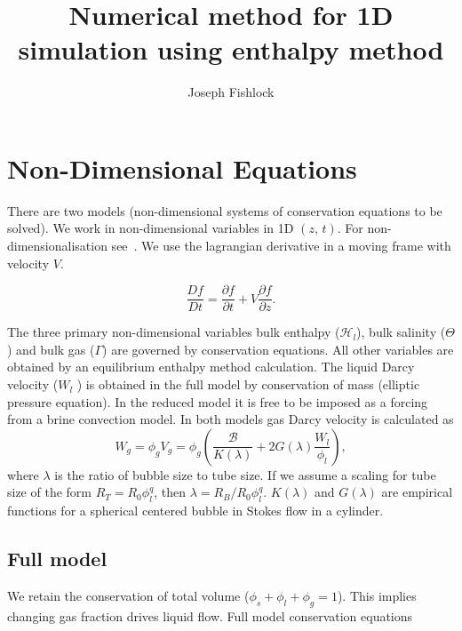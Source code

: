 \documentclass[a4paper,11pt]{article}
\title{\textbf{Numerical method for 1D simulation using enthalpy method}}
\author{Joseph Fishlock}
\numberwithin{equation}{section}
\begin{document}
\maketitle

\tableofcontents

\clearpage

\section{Non-Dimensional Equations}\label{sec:Non-Dimensional-Equations}

There are two models (non-dimensional systems of conservation equations to be solved).
We work in non-dimensional variables in 1D $(z, \, t)$.
For non-dimensionalisation see~.
We use the lagrangian derivative in a moving frame with velocity $V$.

\begin{equation}\label{eq:lagrangian-derivative}
  \frac{Df}{Dt} = \frac{\partial f}{\partial t} + V \frac{\partial f}{\partial z}.
\end{equation}

The three primary non-dimensional variables
bulk enthalpy ($\mathcal{H}_l$),
bulk salinity ($\Theta$ )
and bulk gas ($\Gamma$)
are governed by conservation equations.
All other variables are obtained by an equilibrium enthalpy method calculation.
The liquid Darcy velocity ($W_l$ ) is obtained in the full model by conservation of mass (elliptic pressure equation).
In the reduced model it is free to be imposed as a forcing from a brine convection model.
In both models gas Darcy velocity is calculated as
\begin{equation}\label{eq:Gas-Darcy-Velocity}
W_g = \phi_g V_g = \phi_g \left( \frac{\mathcal{B}}{K(\lambda)} + 2 G(\lambda) \frac{W_l}{\phi_l} \right),
\end{equation}
where $\lambda$ is the ratio of bubble size to tube size.
If we assume a scaling for tube size of the form $R_T = R_0 \phi_l^q$,
then  $\lambda = R_B / R_0 \phi_l^q$.
$K(\lambda)$ and $G(\lambda)$ are empirical functions for a spherical centered bubble in Stokes flow in a cylinder.


\subsection{Full model}\label{sec:Full-model}

We retain the conservation of total volume ($\phi_s + \phi_l + \phi_g = 1$).
This implies changing gas fraction drives liquid flow.
Full model conservation equations
\end{document}
